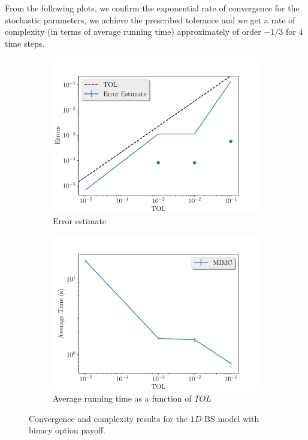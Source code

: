 \documentclass[11pt]{article}
\begin{document}
From the following plots, we confirm the exponential rate of convergence for the stochastic parameters, we achieve the prescribed tolerance and  we get a rate of complexity (in terms of average running time) approximately of order $-1/3$ for $4$ time steps.
\begin{figure}[!h]
	\centering
	\begin{subfigure}{.5\textwidth}
		\centering
		\includegraphics[width=1\linewidth]{./figures/binary_4_steps/error_estimate.pdf}
		\caption{Error estimate}
		\label{fig:misc_binary_4_steps_sub1}
	\end{subfigure}%
	\begin{subfigure}{.5\textwidth}
		\centering
		\includegraphics[width=1\linewidth]{./figures/binary_4_steps/average_running_time.pdf}
		\caption{Average running time as a function of $TOL$}
		\label{fig:misc_binary_4_steps_sub2}
	\end{subfigure}%
	\caption{Convergence and complexity results for the $1D$ BS model with binary option payoff.}
	\label{fig:misc_binary_4_steps_2}
\end{figure}
\end{document}
